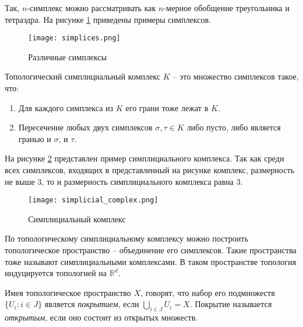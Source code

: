 Так, $n$-симплекс можно рассматривать как $n$-мерное обобщение треугольника и тетраэдра. На рисунке \ref{simplex} приведены примеры симплексов.
\begin{figure}[!htbp]
	\centering
	\texttt{[image: simplices.png]}
	\caption{Различные симплексы}
	\label{simplex}
\end{figure}
\begin{definition}
	Топологический симплициальный комплекс $K$ -- это множество симплексов такое, что:
	\begin{enumerate}
		\item Для каждого симплекса из $K$ его грани тоже лежат в $K$.
		\item Пересечение любых двух симплексов $\sigma, \tau \in K$ либо пусто, либо является гранью и $\sigma$, и $\tau$.
	\end{enumerate}
\end{definition}
На рисунке \ref{simplicial_complex} представлен пример симплициального комплекса. Так как среди всех симплексов, входящих в представленный на рисунке комплекс, размерность не выше $3$, то и размерность симплициального комплекса равна $3$.
\begin{figure}[!htbp]
	\centering
	\texttt{[image: simplicial\_complex.png]}
	\caption{Симплициальный комплекс}
	\label{simplicial_complex}
\end{figure}
По топологическому симплициальному комплексу можно построить топологическое пространство -- объединение его симплексов. Такие пространства тоже называют симплициальными комплексами. В таком пространстве топология индуцируется топологией на $\mathbb{R}^d$.

Имея топологическое пространство $X$, говорят, что набор его подмножеств $\{U_i : i \in J\} $ является {\it покрытием}, если $ \bigcup\limits_{i \in J} U_i = X$. Покрытие называется {\it открытым}, если оно состоит из открытых множеств.

